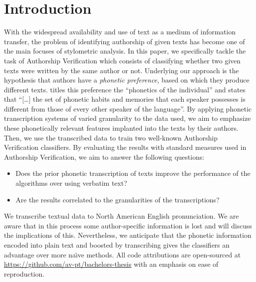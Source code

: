 \chapter{Introduction}\label{introduction}
With the widespread availability and use of text as a medium of information transfer, the problem of identifying authorship of given texts has become one of the main focuses of stylometric analysis.
In this paper, we specifically tackle the task of Authorship Verification which consists of classifying whether two given texts were written by the same author or not.
Underlying our approach is the hypothesis that authors have a \textit{phonetic preference}, based on which they produce different texts.
\cite{ladefoged2014courseInPhonetics} titles this preference the ``phonetics of the individual'' and states that ``[\ldots] the set of phonetic habits and memories that each speaker possesses is different from those of every other speaker of the language''.
By applying phonetic transcription systems of varied granularity to the data used, we aim to emphasize these phonetically relevant features implanted into the texts by their authors.
Then, we use the transcribed data to train two well-known Authorship Verification classifiers.
By evaluating the results with standard measures used in Authorship Verification, we aim to answer the following questions:
\begin{itemize}
  \item Does the prior phonetic transcription of texts improve the performance of the algorithms over using verbatim text?
  \item Are the results correlated to the granularities of the transcriptions?
\end{itemize}
We transcribe textual data to North American English pronunciation.
We are aware that in this process some author-specific information is lost and will discuss the implications of this.
Nevertheless, we anticipate that the phonetic information encoded into plain text and boosted by transcribing gives the classifiers an advantage over more na\"{\i}ve methods.
All code attributions are open-sourced at \url{https://github.com/av-pt/bachelors-thesis} with an emphasis on ease of reproduction.